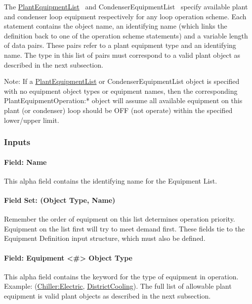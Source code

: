 The \hyperref[plantequipmentlist]{PlantEquipmentList} ~and CondenserEquipmentList ~specify available plant and condenser loop equipment respectively for any loop operation scheme. Each statement contains the object name, an identifying name (which links the definition back to one of the operation scheme statements) and a variable length of data pairs. These pairs refer to a plant equipment type and an identifying name. The type in this list of pairs must correspond to a valid plant object as described in the next subsection.

Note: If a \hyperref[plantequipmentlist]{PlantEquipmentList} or CondenserEquipmentList object is specified with no equipment object types or equipment names, then the corresponding PlantEquipmentOperation:* object will assume all available equipment on this plant (or condenser) loop should be OFF (not operate) within the specified lower/upper limit.

\subsubsection{Inputs}\label{inputs-15-009}

\paragraph{Field: Name}\label{field-name-8-013}

This alpha field contains the identifying name for the Equipment List.

\paragraph{Field Set: (Object Type, Name)}\label{field-set-object-type-name-1}

Remember the order of equipment on this list determines operation priority. Equipment on the list first will try to meet demand first. These fields tie to the Equipment Definition input structure, which must also be defined.

\paragraph{Field: Equipment \textless{}\#\textgreater{} Object Type}\label{field-equipment-object-type-1}

This alpha field contains the keyword for the type of equipment in operation. Example: (\hyperref[chillerelectric]{Chiller:Electric}, \hyperref[districtcooling]{DistrictCooling}). The full list of allowable plant equipment is valid plant objects as described in the next subsection.

